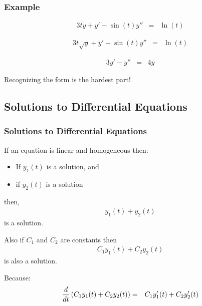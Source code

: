 \begin{frame}
  \frametitle{Example}

  \vspace*{-3em}
  \begin{eqnarray*}
    3t y + y' - \sin(t) y'' & = & \ln(t)
  \end{eqnarray*}
  \centerline{}

  \begin{eqnarray*}
    3t \sqrt{y} + y' - \sin(t) y'' & = & \ln(t)
  \end{eqnarray*}
  \centerline{}

  \begin{eqnarray*}
    3 y' -y'' & = & 4 y
  \end{eqnarray*}
  \centerline{}

  Recognizing the form is the hardest part!

\end{frame}

\subsection{Solutions to Differential Equations}

\begin{frame}
  \frametitle{Solutions to Differential Equations}

  If an equation is linear and homogeneous then:
  \begin{itemize}
  \item If $y_1(t)$ is a solution, and
  \item if $y_2(t)$ is a solution
  \end{itemize}

  then,
  \begin{eqnarray*}
    y_1(t) + y_2(t)
  \end{eqnarray*}
  is a solution.

  Also if $C_1$ and $C_2$ are constants then
  \begin{eqnarray*}
    C_1 y_1(t) + C_2 y_2(t)
  \end{eqnarray*}
  is also a solution.

  Because:
  \begin{eqnarray*}
    \frac{d}{dt} \left( C_1 y_1(t) + C_2 y_2(t) \right) & = &
    C_1 y_1'(t) + C_2 y_2'(t)
  \end{eqnarray*}


\end{frame}


